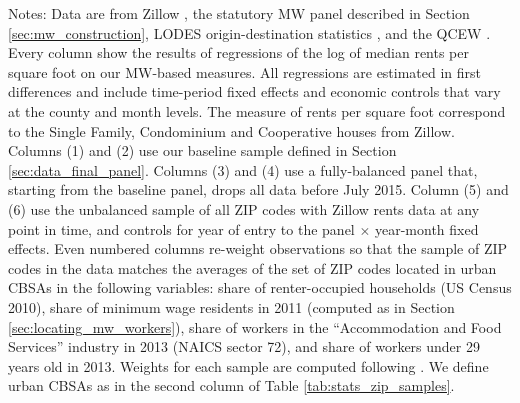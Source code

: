 \begin{landscape}
\begin{table}[hbt!]
    \begin{minipage}{.95\linewidth} \footnotesize
        \vspace{2mm}
        Notes:
        Data are from Zillow \parencite{ZillowData}, 
        the statutory MW panel described in Section \ref{sec:mw_construction}, 
        LODES origin-destination statistics \parencite{CensusLODES},
        and the QCEW \parencite{QCEW}.
        Every column show the results of regressions of the log of 
        median rents per square foot on our MW-based measures.
        All regressions are estimated in first differences and include 
        time-period fixed effects and economic controls that vary at the 
        county and month levels.
        The measure of rents per square foot correspond to the Single Family, 
        Condominium and Cooperative houses from Zillow.
        Columns (1) and (2) use our baseline sample defined in Section 
        \ref{sec:data_final_panel}.
        Columns (3) and (4) use a fully-balanced panel that, starting from the 
        baseline panel, drops all data before July 2015.
        Column (5) and (6) use the unbalanced sample of all ZIP codes with 
        Zillow rents data at any point in time, and controls for year of entry 
        to the panel $\times$ year-month fixed effects.
        Even numbered columns re-weight observations so that the sample of 
        ZIP codes in the data matches the averages of the set of ZIP codes
        located in urban CBSAs in the following variables:
        share of renter-occupied households (US Census 2010),
        share of minimum wage residents in 2011 (computed as in Section 
        \ref{sec:locating_mw_workers}),
        share of workers in the ``Accommodation and Food Services'' industry 
        in 2013 (NAICS sector 72),
        and share of workers under 29 years old in 2013.
        Weights for each sample are computed following \textcite{Hainmueller2012}.
        We define urban CBSAs as in the second column of Table 
        \ref{tab:stats_zip_samples}.
    \end{minipage}
\end{table}
\end{landscape}
